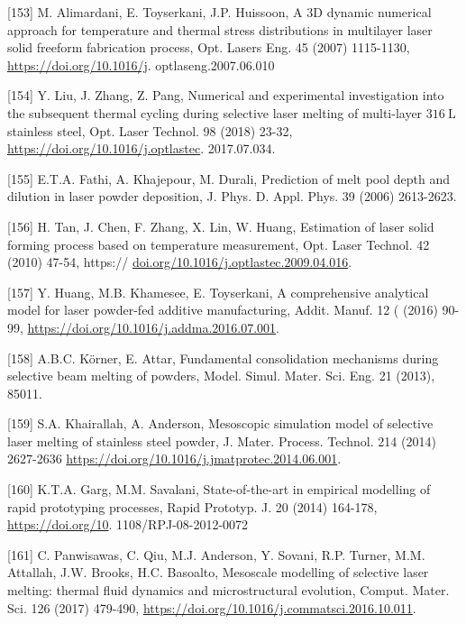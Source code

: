 \documentclass[10pt]{article}
\begin{document}
[153] M. Alimardani, E. Toyserkani, J.P. Huissoon, A 3D dynamic numerical approach for temperature and thermal stress distributions in multilayer laser solid freeform fabrication process, Opt. Lasers Eng. 45 (2007) 1115-1130, \href{https://doi.org/10.1016/j}{https://doi.org/10.1016/j}. optlaseng.2007.06.010

[154] Y. Liu, J. Zhang, Z. Pang, Numerical and experimental investigation into the subsequent thermal cycling during selective laser melting of multi-layer $316 \mathrm{~L}$ stainless steel, Opt. Laser Technol. 98 (2018) 23-32, \href{https://doi.org/10.1016/j.optlastec}{https://doi.org/10.1016/j.optlastec}. 2017.07.034.

[155] E.T.A. Fathi, A. Khajepour, M. Durali, Prediction of melt pool depth and dilution in laser powder deposition, J. Phys. D. Appl. Phys. 39 (2006) 2613-2623.

[156] H. Tan, J. Chen, F. Zhang, X. Lin, W. Huang, Estimation of laser solid forming process based on temperature measurement, Opt. Laser Technol. 42 (2010) 47-54, https:// \href{http://doi.org/10.1016/j.optlastec.2009.04.016}{doi.org/10.1016/j.optlastec.2009.04.016}.

[157] Y. Huang, M.B. Khamesee, E. Toyserkani, A comprehensive analytical model for laser powder-fed additive manufacturing, Addit. Manuf. 12 ( (2016) 90-99, \href{https://doi.org/10.1016/j.addma.2016.07.001}{https://doi.org/10.1016/j.addma.2016.07.001}.

[158] A.B.C. Körner, E. Attar, Fundamental consolidation mechanisms during selective beam melting of powders, Model. Simul. Mater. Sci. Eng. 21 (2013), 85011.

[159] S.A. Khairallah, A. Anderson, Mesoscopic simulation model of selective laser melting of stainless steel powder, J. Mater. Process. Technol. 214 (2014) 2627-2636 \href{https://doi.org/10.1016/j.jmatprotec.2014.06.001}{https://doi.org/10.1016/j.jmatprotec.2014.06.001}.

[160] K.T.A. Garg, M.M. Savalani, State-of-the-art in empirical modelling of rapid prototyping processes, Rapid Prototyp. J. 20 (2014) 164-178, \href{https://doi.org/10}{https://doi.org/10}. 1108/RPJ-08-2012-0072

[161] C. Panwisawas, C. Qiu, M.J. Anderson, Y. Sovani, R.P. Turner, M.M. Attallah, J.W. Brooks, H.C. Basoalto, Mesoscale modelling of selective laser melting: thermal fluid dynamics and microstructural evolution, Comput. Mater. Sci. 126 (2017) 479-490, \href{https://doi.org/10.1016/j.commatsci.2016.10.011}{https://doi.org/10.1016/j.commatsci.2016.10.011}.
\end{document}
